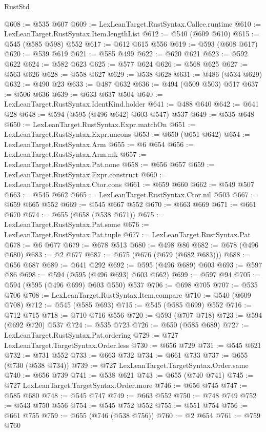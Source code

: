 \begin{lexlean}{RustStd}
\begin{coremodule}
@608 := @535 @607
@609 := LexLeanTarget.RustSyntax.Callee.runtime
@610 := LexLeanTarget.RustSyntax.Item.lengthList
@612 := @540 (@609 @610)
@615 := @545 (@585 @598) @552
@617 := @612 @615 @556
@619 := @593 (@608 @617)
@620 := @539 @619
@621 := @585 @499
@622 := @620 @621
@623 := @592 @622
@624 := @582 @623
@625 := @577 @624
@626 := @568 @625
@627 := @563 @626
@628 := @558 @627
@629 := @538 @628
@631 := @486 (@534 @629)
@632 := @490 @23
@633 := @487 @632
@636 := @494 (@509 @503) @517
@637 := @506 @636
@639 := @633 @637 @504
@640 := LexLeanTarget.RustSyntax.IdentKind.holder
@641 := @488 @640
@642 := @641 @28
@648 := @594 (@595 (@496 @642) @603 @547) @537
@649 := @535 @648
@650 := LexLeanTarget.RustSyntax.Expr.matchOn
@651 := LexLeanTarget.RustSyntax.Expr.uncons
@653 := @650 (@651 @642)
@654 := LexLeanTarget.RustSyntax.Arm
@655 := @6 @654
@656 := LexLeanTarget.RustSyntax.Arm.mk
@657 := LexLeanTarget.RustSyntax.Pat.none
@658 := @656 @657
@659 := LexLeanTarget.RustSyntax.Expr.construct
@660 := LexLeanTarget.RustSyntax.Ctor.cons
@661 := @659 @660
@662 := @549 @507
@663 := @545 @662
@665 := LexLeanTarget.RustSyntax.Ctor.nil @503
@667 := @659 @665 @552
@669 := @545 @667 @552
@670 := @663 @669
@671 := @661 @670
@674 := @655 (@658 (@538 @671))
@675 := LexLeanTarget.RustSyntax.Pat.some
@676 := LexLeanTarget.RustSyntax.Pat.tuple
@677 := LexLeanTarget.RustSyntax.Pat
@678 := @6 @677
@679 := @678 @513
@680 := @498 @86
@682 := @678 (@496 @680)
@683 := @2 @677
@687 := @675 (@676 (@679 (@682 @683)))
@688 := @656 @687
@689 := @641 @292
@692 := @595 (@496 @689) @603
@693 := @597 @86
@698 := @594 (@595 (@496 @693) @603 @662)
@699 := @597 @94
@705 := @594 (@595 (@496 @699) @603 @550) @537
@706 := @698 @705
@707 := @535 @706
@708 := LexLeanTarget.RustSyntax.Item.compare
@710 := @540 (@609 @708)
@712 := @545 (@585 @693)
@715 := @545 (@585 @699) @552
@716 := @712 @715
@718 := @710 @716 @556
@720 := @593 (@707 @718)
@723 := @594 (@692 @720) @537
@724 := @535 @723
@726 := @650 (@585 @689)
@727 := LexLeanTarget.RustSyntax.Pat.ordering
@729 := @727 LexLeanTarget.TargetSyntax.Order.less
@730 := @656 @729
@731 := @545 @621
@732 := @731 @552
@733 := @663 @732
@734 := @661 @733
@737 := @655 (@730 (@538 @734))
@739 := @727 LexLeanTarget.TargetSyntax.Order.same
@740 := @656 @739
@741 := @538 @621
@743 := @655 (@740 @741)
@745 := @727 LexLeanTarget.TargetSyntax.Order.more
@746 := @656 @745
@747 := @585 @680
@748 := @545 @747
@749 := @663 @552
@750 := @748 @749
@752 := @543 @750 @556
@754 := @545 @752 @552
@755 := @551 @754
@756 := @661 @755
@759 := @655 (@746 (@538 @756))
@760 := @2 @654
@761 := @759 @760

\end{coremodule}
\end{lexlean}
